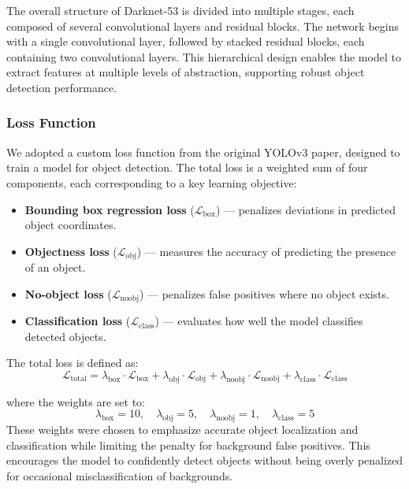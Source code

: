 \documentclass{article}
\begin{document}
The overall structure of Darknet-53 is divided into multiple stages, each composed of several convolutional layers and residual blocks. The network begins with a single convolutional layer, followed by stacked residual blocks, each containing two convolutional layers. This hierarchical design enables the model to extract features at multiple levels of abstraction, supporting robust object detection performance.

\subsubsection{Loss Function}
We adopted a custom loss function from the original YOLOv3 paper, designed to train a model for object detection. The total loss is a weighted sum of four components, each corresponding to a key learning objective:

\begin{itemize}
    \item \textbf{Bounding box regression loss} (\( \mathcal{L}_{\text{box}} \)) — penalizes deviations in predicted object coordinates.
    \item \textbf{Objectness loss} (\( \mathcal{L}_{\text{obj}} \)) — measures the accuracy of predicting the presence of an object.
    \item \textbf{No-object loss} (\( \mathcal{L}_{\text{noobj}} \)) — penalizes false positives where no object exists.
    \item \textbf{Classification loss} (\( \mathcal{L}_{\text{class}} \)) — evaluates how well the model classifies detected objects.
\end{itemize}

The total loss is defined as:
\begin{equation}
\mathcal{L}_{\text{total}} = \lambda_{\text{box}} \cdot \mathcal{L}_{\text{box}} 
+ \lambda_{\text{obj}} \cdot \mathcal{L}_{\text{obj}} 
+ \lambda_{\text{noobj}} \cdot \mathcal{L}_{\text{noobj}} 
+ \lambda_{\text{class}} \cdot \mathcal{L}_{\text{class}}
\end{equation}

where the weights are set to:
\[
\lambda_{\text{box}} = 10,\quad 
\lambda_{\text{obj}} = 5,\quad 
\lambda_{\text{noobj}} = 1,\quad 
\lambda_{\text{class}} = 5
\]
These weights were chosen to emphasize accurate object localization and classification while limiting the penalty for background false positives. This encourages the model to confidently detect objects without being overly penalized for occasional misclassification of backgrounds.
\end{document}
